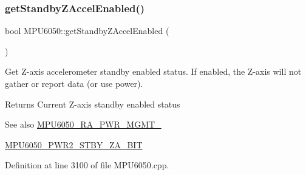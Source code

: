 \begin{DoxyCode}{0}

\end{DoxyCode}
\mbox{\label{classMPU6050_adae85612e047c4c7f0c3b7110fc92956}} 
\subsubsection{\texorpdfstring{getStandbyZAccelEnabled()}{getStandbyZAccelEnabled()}}
{\footnotesize\ttfamily bool M\+P\+U6050\+::get\+Standby\+Z\+Accel\+Enabled (\begin{DoxyParamCaption}{ }\end{DoxyParamCaption})}

Get Z-\/axis accelerometer standby enabled status. If enabled, the Z-\/axis will not gather or report data (or use power). \begin{DoxyReturn}{Returns}
Current Z-\/axis standby enabled status 
\end{DoxyReturn}
\begin{DoxySeeAlso}{See also}
\mbox{\hyperlink{MPU6050_8h_aace6ce286da4d5f8c8f5ba6f80688e13}{M\+P\+U6050\+\_\+\+R\+A\+\_\+\+P\+W\+R\+\_\+\+M\+G\+M\+T\+\_}} 

\mbox{\hyperlink{MPU6050_8h_a913262cf8ad43c4dcb28aa31521fac23}{M\+P\+U6050\+\_\+\+P\+W\+R2\+\_\+\+S\+T\+B\+Y\+\_\+\+Z\+A\+\_\+\+B\+IT}} 
\end{DoxySeeAlso}


Definition at line 3100 of file M\+P\+U6050.\+cpp.


